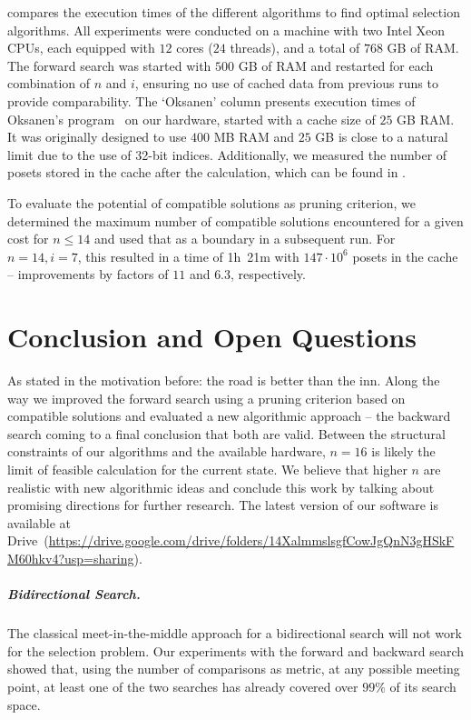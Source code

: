 \documentclass[a4paper,UKenglish,cleveref, autoref, thm-restate, anonymous]{lipics-v2021}
\newcommand{\projectURL}[0]{https://drive.google.com/drive/folders/14XalmmslsgfCowJgQnN3gHSkFM60hkv4?usp=sharing} %
\newcommand{\projectServer}[0]{Drive} %
\begin{document}
 compares the execution times of the different algorithms to find optimal selection algorithms.
All experiments were conducted on a machine with two Intel Xeon CPUs, each equipped with $12$ cores ($24$ threads), and a total of $768$ GB of RAM.
The forward search was started with $500$ GB of RAM and restarted for each combination of $n$ and $i$, ensuring no use of cached data from previous runs to provide comparability.
The `Oksanen' column presents execution times of Oksanen's program~\cite{Oksanen} on our hardware, started with a cache size of $25$ GB RAM.
It was originally designed to use $400$ MB RAM and $25$ GB is close to a natural limit due to the use of 32-bit indices.
Additionally, we measured the number of posets stored in the cache after the calculation, which can be found in .

To evaluate the potential of compatible solutions as pruning criterion, we determined the maximum number of compatible solutions encountered for a given cost for $n \leq 14$ and used that as a boundary in a subsequent run.
For $n = 14, i = 7$, this resulted in a time of 1h~21m with $147 \cdot 10^6$ posets in the cache -- improvements by factors of $11$ and $6.3$, respectively.


\section{Conclusion and Open Questions}


As stated in the motivation before: the road is better than the inn.
Along the way we improved the forward search using a pruning criterion based on compatible solutions and evaluated a new algorithmic approach -- the backward search coming to a final conclusion that both are valid.
Between the structural constraints of our algorithms and the available hardware, $n=16$ is likely the limit of feasible calculation for the current state.
We believe that higher $n$ are realistic with new algorithmic ideas and conclude this work by talking about promising directions for further research.
The latest version of our software is available at \projectServer~(\url{\projectURL}).

\subparagraph{Bidirectional Search.}
The classical meet-in-the-middle approach for a bidirectional search will not work for the selection problem.
Our experiments with the forward and backward search showed that, using the number of comparisons as metric, at any possible meeting point, at least one of the two searches has already covered over $99\%$ of its search space.
\end{document}
